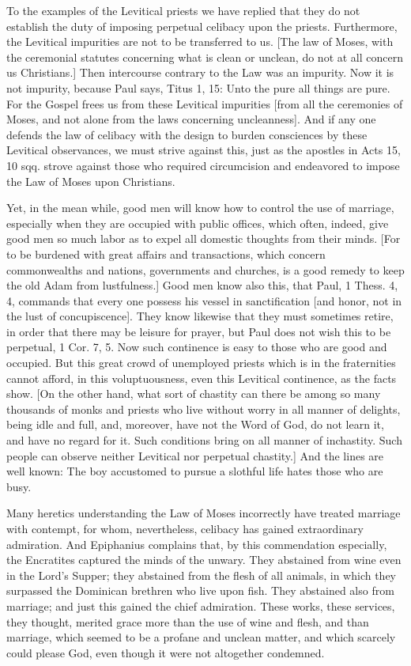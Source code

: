 To the examples of the Levitical priests we have replied that they do
not establish the duty of imposing perpetual celibacy upon the
priests.  Furthermore, the Levitical impurities are not to be
transferred to us.  [The law of Moses, with the ceremonial statutes
concerning what is clean or unclean, do not at all concern us
Christians.] Then intercourse contrary to the Law was an impurity.
Now it is not impurity, because Paul says, Titus 1, 15: Unto the pure
all things are pure.  For the Gospel frees us from these Levitical
impurities [from all the ceremonies of Moses, and not alone from the
laws concerning uncleanness].  And if any one defends the law of
celibacy with the design to burden consciences by these Levitical
observances, we must strive against this, just as the apostles in
Acts 15, 10 sqq. strove against those who required circumcision and
endeavored to impose the Law of Moses upon Christians.

Yet, in the mean while, good men will know how to control the use of
marriage, especially when they are occupied with public offices,
which often, indeed, give good men so much labor as to expel all
domestic thoughts from their minds.  [For to be burdened with great
affairs and transactions, which concern commonwealths and nations,
governments and churches, is a good remedy to keep the old Adam from
lustfulness.] Good men know also this, that Paul, 1 Thess. 4, 4,
commands that every one possess his vessel in sanctification [and
honor, not in the lust of concupiscence].  They know likewise that
they must sometimes retire, in order that there may be leisure for
prayer, but Paul does not wish this to be perpetual, 1 Cor. 7, 5. Now
such continence is easy to those who are good and occupied.  But this
great crowd of unemployed priests which is in the fraternities cannot
afford, in this voluptuousness, even this Levitical continence, as
the facts show.  [On the other hand, what sort of chastity can there
be among so many thousands of monks and priests who live without
worry in all manner of delights, being idle and full, and, moreover,
have not the Word of God, do not learn it, and have no regard for it.
Such conditions bring on all manner of inchastity.  Such people can
observe neither Levitical nor perpetual chastity.] And the lines are
well known: The boy accustomed to pursue a slothful life hates those
who are busy.

Many heretics understanding the Law of Moses incorrectly have treated
marriage with contempt, for whom, nevertheless, celibacy has gained
extraordinary admiration.  And Epiphanius complains that, by this
commendation especially, the Encratites captured the minds of the
unwary.  They abstained from wine even in the Lord's Supper; they
abstained from the flesh of all animals, in which they surpassed the
Dominican brethren who live upon fish.  They abstained also from
marriage; and just this gained the chief admiration.  These works,
these services, they thought, merited grace more than the use of wine
and flesh, and than marriage, which seemed to be a profane and
unclean matter, and which scarcely could please God, even though it
were not altogether condemned.

